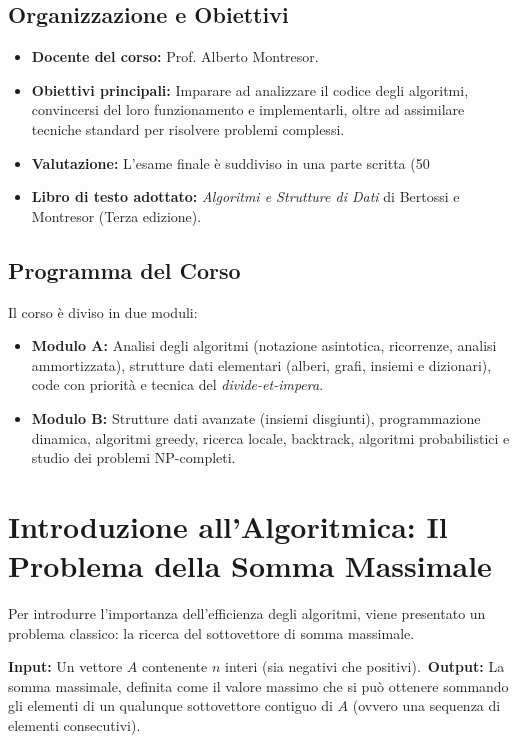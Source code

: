 \documentclass[12pt, a4paper]{article}
\begin{document}
\subsection{Organizzazione e Obiettivi}
\begin{itemize}
\item \textbf{Docente del corso:} Prof. Alberto Montresor.
\item \textbf{Obiettivi principali:} Imparare ad analizzare il codice degli algoritmi, convincersi del loro funzionamento e implementarli, oltre ad assimilare tecniche standard per risolvere problemi complessi.
\item \textbf{Valutazione:} L'esame finale è suddiviso in una parte scritta (50%
\item \textbf{Libro di testo adottato:} \textit{Algoritmi e Strutture di Dati} di Bertossi e Montresor (Terza edizione).
\end{itemize}

\subsection{Programma del Corso}
Il corso è diviso in due moduli:
\begin{itemize}
\item \textbf{Modulo A:} Analisi degli algoritmi (notazione asintotica, ricorrenze, analisi ammortizzata), strutture dati elementari (alberi, grafi, insiemi e dizionari), code con priorità e tecnica del \textit{divide-et-impera}.
\item \textbf{Modulo B:} Strutture dati avanzate (insiemi disgiunti), programmazione dinamica, algoritmi greedy, ricerca locale, backtrack, algoritmi probabilistici e studio dei problemi NP-completi.
\end{itemize}

\newpage

\section{Introduzione all'Algoritmica: Il Problema della Somma Massimale}

Per introdurre l'importanza dell'efficienza degli algoritmi, viene presentato un problema classico: la ricerca del sottovettore di somma massimale.

\begin{tcolorbox}[colback=lightergray!10, colframe=tocsec, title=\textbf{Definizione del Problema: Somma Massimale}]
\textbf{Input:} Un vettore $A$ contenente $n$ interi (sia negativi che positivi).\
\textbf{Output:} La somma massimale, definita come il valore massimo che si può ottenere sommando gli elementi di un qualunque sottovettore contiguo di $A$ (ovvero una sequenza di elementi consecutivi).
\end{tcolorbox}
\end{document}

